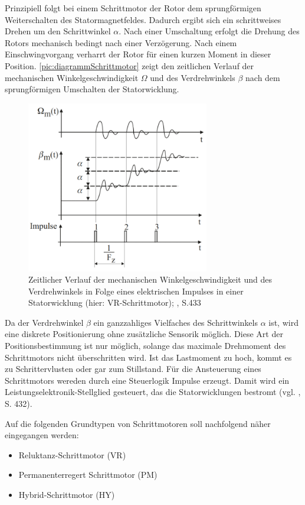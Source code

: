Prinzipiell folgt bei einem Schrittmotor der Rotor dem sprungförmigen Weiterschalten des Statormagnetfeldes. Dadurch ergibt sich ein schrittweises Drehen um den Schrittwinkel $\alpha$. Nach einer Umschaltung erfolgt die Drehung des Rotors mechanisch bedingt nach einer Verzögerung. Nach einem Einschwingvorgang verharrt der Rotor für einen kurzen Moment in dieser Position.  \autoref{pic:diagrammSchrittmotor} zeigt den zeitlichen Verlauf der mechanischen Winkelgeschwindigkeit  $\Omega$ und des Verdrehwinkels $\beta$ nach dem sprungförmigen Umschalten der Statorwicklung.  

 
\begin{figure}[h]
	\begin{center}
		\includegraphics[width=8cm]{DiagrammVerlaufSchrittmotor.png}
		\caption{Zeitlicher Verlauf der mechanischen Winkelgeschwindigkeit und des Verdrehwinkels in Folge eines elektrischen Impulses in einer Statorwicklung (hier: VR-Schrittmotor); \cite{kleinantriebe}, S.433}
		\label{pic:diagrammSchrittmotor}
	\end{center}
\end{figure}


Da der Verdrehwinkel $\beta$ ein ganzzahliges Vielfaches des Schrittwinkels $\alpha$ ist, wird eine diskrete Positionierung ohne zusätzliche Sensorik möglich. Diese Art der Positionsbestimmung ist nur möglich, solange das maximale Drehmoment des Schrittmotors nicht überschritten wird. Ist das Lastmoment zu hoch, kommt es zu Schrittervlusten oder gar zum Stillstand.   Für die Ansteuerung eines Schrittmotors wereden durch eine Steuerlogik Impulse erzeugt. Damit wird ein Leistungselektronik-Stellglied gesteuert, das die Statorwicklungen bestromt (vgl. \cite{kleinantriebe}, S. 432). \newline

Auf die folgenden Grundtypen von Schrittmotoren soll nachfolgend näher eingegangen werden:
\begin{itemize}
	\item Reluktanz-Schrittmotor (VR)
	\item Permanenterregert Schrittmotor (PM)
	\item Hybrid-Schrittmotor (HY)
\end{itemize}

